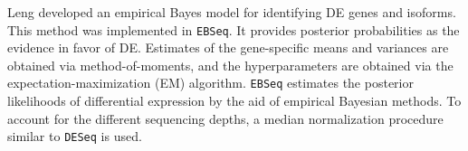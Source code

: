 Leng developed an empirical Bayes model for identifying DE genes and isoforms. This method was implemented in {\tt EBSeq}. It provides posterior probabilities as the evidence in favor of DE. Estimates of the gene-specific means and variances are obtained via method-of-moments, and the hyperparameters are obtained via the expectation-maximization (EM) algorithm\citep{leng2013ebseq}. {\tt EBSeq} estimates the posterior likelihoods of differential expression by the aid of empirical Bayesian methods. To account for the different sequencing depths, a median normalization procedure similar to {\tt DESeq} is used. 